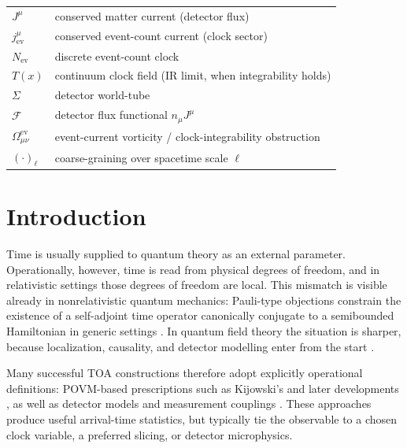 \documentclass[pdflatex,sn-mathphys-num]{sn-jnl}
\theoremstyle{thmstylethree}
\theoremstyle{thmstyleone}
\theoremstyle{thmstyletwo}
\numberwithin{equation}{section}
\begin{document}
        \begin{center}
            \begin{tabular}{ll}
                $J^\mu$ & conserved matter current (detector flux) \\
                $j^\mu_{\mathrm{ev}}$ & conserved event-count current (clock sector) \\
                $N_{\mathrm{ev}}$ & discrete event-count clock \\
                $T(x)$ & continuum clock field (IR limit, when integrability holds) \\
                $\Sigma$ & detector world-tube \\
                $\mathcal{F}$ & detector flux functional $n_\mu J^\mu$ \\
                $\Omega^{\mathrm{ev}}_{\mu\nu}$ & event-current vorticity / clock-integrability obstruction \\
                $(\cdot)_\ell$ & coarse-graining over spacetime scale $\ell$
            \end{tabular}
        \end{center}

    \section{Introduction}
        
        Time is usually supplied to quantum theory as an external parameter. Operationally, however, time is read from physical degrees of freedom, and in relativistic settings those degrees of freedom are local. This mismatch is visible already in nonrelativistic quantum mechanics: Pauli-type objections constrain the existence of a self-adjoint time operator canonically conjugate to a semibounded Hamiltonian in generic settings \cite{Pauli1980,Muga2008}. In quantum field theory the situation is sharper, because localization, causality, and detector modelling enter from the start \cite{Muga2008,ColosiOeckl2025TimeOperatorTOA}.
        
        Many successful TOA constructions therefore adopt explicitly operational definitions: POVM-based prescriptions such as Kijowski's \cite{Kijowski1974} and later developments \cite{Giannitrapani1997,Muga2008}, as well as detector models and measurement couplings \cite{ColosiOeckl2025TimeOperatorTOA}. These approaches produce useful arrival-time statistics, but typically tie the observable to a chosen clock variable, a preferred slicing, or detector microphysics.
        
\end{document}
